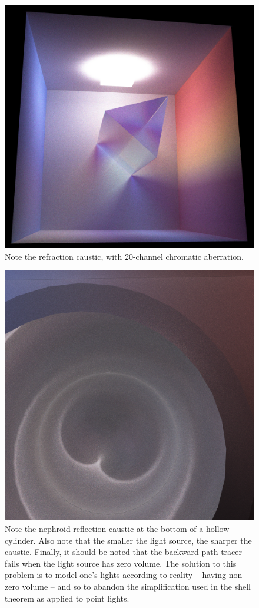 \documentclass[12pt]{article}
\begin{document}
\begin{figure} 
\centering
  \includegraphics[width = 6 in]{fig7.png}
  \caption{ Note the refraction caustic, with 20-channel chromatic aberration.
}
\end{figure}


\begin{figure} 
\centering
  \includegraphics[width = 6 in]{fig8.png}
  \caption{ Note the nephroid reflection caustic at the bottom of a hollow cylinder.
Also note that the smaller the light source, the sharper the caustic.
Finally, it should be noted that the backward path tracer fails when the light source has zero volume.
The solution to this problem is to model one's lights according to reality -- having non-zero volume -- and so to abandon the simplification used in the shell theorem as applied to point lights.
}
\end{figure}
\end{document}
